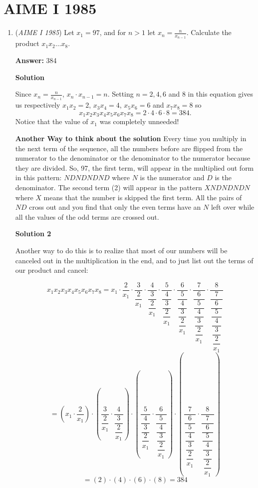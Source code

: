 \section{AIME I 1985}
        \begin{enumerate}
        	\item (\textit{AIME I 1985}) Let $x_1=97$, and for $n>1$ let $x_n=\frac{n}{x_{n-1}}$. Calculate the product $x_1x_2 \ldots x_8$.


 
 \textbf{Answer: }384



\textbf{Solution}

Since $x_n=\frac{n}{x_{n-1}}$, $x_n \cdot x_{n - 1} = n$.  Setting $n = 2, 4, 6$ and $8$ in this equation gives us respectively $x_1x_2 = 2$, $x_3x_4 = 4$, $x_5x_6 = 6$ and $x_7x_8 = 8$ so 
 \[x_1x_2x_3x_4x_5x_6x_7x_8 = 2\cdot4\cdot6\cdot8 = \boxed{384}.\] Notice that the value of $x_1$ was completely unneeded!

 \textbf{Another Way to think about the solution} Every time you multiply in the next term of the sequence, all the numbers before are flipped from the numerator to the denominator or the denominator to the numerator because they are divided. So, 97, the first term, will appear in the multiplied out form in this pattern: $NDNDNDND$ where $N$ is the numerator and $D$ is the denominator. The second term (2) will appear in the pattern $XNDNDNDN$ where $X$ means that the number is skipped the first term. All the pairs of $ND$ cross out and you find that only the even terms have an $N$ left over while all the values of the odd terms are crossed out.

 



\textbf{Solution 2}

Another way to do this is to realize that most of our numbers will be canceled out in the multiplication in the end, and to just list out the terms of our product and cancel:

 
 \[x_1x_2x_3x_4x_5x_6x_7x_8=x_1\cdot\dfrac{2}{x_1}\cdot\dfrac{3}{\dfrac{2}{x_1}}\cdot\dfrac{4}{\dfrac{3}{\dfrac{2}{x_1}}}\cdot\dfrac{5}{\dfrac{4}{\dfrac{3}{\dfrac{2}{x_1}}}}\cdot\dfrac{6}{\dfrac{5}{\dfrac{4}{\dfrac{3}{\dfrac{2}{x_1}}}}}\cdot\dfrac{7}{\dfrac{6}{\dfrac{5}{\dfrac{4}{\dfrac{3}{\dfrac{2}{x_1}}}}}}\cdot\dfrac{8}{\dfrac{7}{\dfrac{6}{\dfrac{5}{\dfrac{4}{\dfrac{3}{\dfrac{2}{x_1}}}}}}}\]
 \[=\left (x_1\cdot\dfrac{2}{x_1} \right )\cdot \left (\dfrac{3}{\dfrac{2}{x_1}}\cdot\dfrac{4}{\dfrac{3}{\dfrac{2}{x_1}}} \right )\cdot \left (\dfrac{5}{\dfrac{4}{\dfrac{3}{\dfrac{2}{x_1}}}}\cdot\dfrac{6}{\dfrac{5}{\dfrac{4}{\dfrac{3}{\dfrac{2}{x_1}}}}} \right )\cdot \left (\dfrac{7}{\dfrac{6}{\dfrac{5}{\dfrac{4}{\dfrac{3}{\dfrac{2}{x_1}}}}}}\cdot\dfrac{8}{\dfrac{7}{\dfrac{6}{\dfrac{5}{\dfrac{4}{\dfrac{3}{\dfrac{2}{x_1}}}}}}} \right )\]
 \[=(2)\cdot (4)\cdot (6)\cdot (8)=\boxed{384}\]




\end{enumerate}
